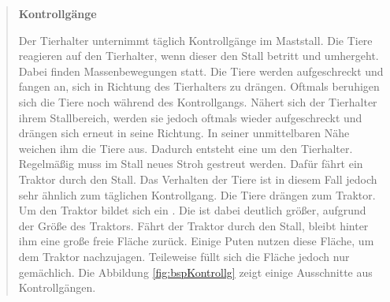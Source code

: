 \begin{quote}

\textbf{Kontrollgänge}\par
Der Tierhalter unternimmt täglich Kontrollgänge im Maststall. Die Tiere reagieren auf den Tierhalter, wenn dieser den Stall betritt und umhergeht. Dabei finden Massenbewegungen statt. Die Tiere werden aufgeschreckt und fangen an, sich in Richtung des Tierhalters zu drängen. Oftmals beruhigen sich die Tiere noch während des Kontrollgangs. Nähert sich der Tierhalter ihrem Stallbereich, werden sie jedoch oftmals wieder aufgeschreckt und drängen sich erneut in seine Richtung. In seiner unmittelbaren Nähe weichen ihm die Tiere aus. Dadurch entsteht eine  um den Tierhalter. Regelmäßig muss im Stall neues Stroh gestreut werden. Dafür fährt ein Traktor durch den Stall. Das Verhalten der Tiere ist in diesem Fall jedoch sehr ähnlich zum täglichen Kontrollgang. Die Tiere drängen zum Traktor. Um den Traktor bildet sich ein . Die  ist dabei deutlich größer, aufgrund der Größe des Traktors. Fährt der Traktor durch den Stall, bleibt hinter ihm eine große freie Fläche zurück. Einige Puten nutzen diese Fläche, um dem Traktor nachzujagen. Teileweise füllt sich die Fläche jedoch nur gemächlich. Die Abbildung \ref{fig:bspKontrollg} zeigt einige Ausschnitte aus Kontrollgängen. 
\end{quote}



